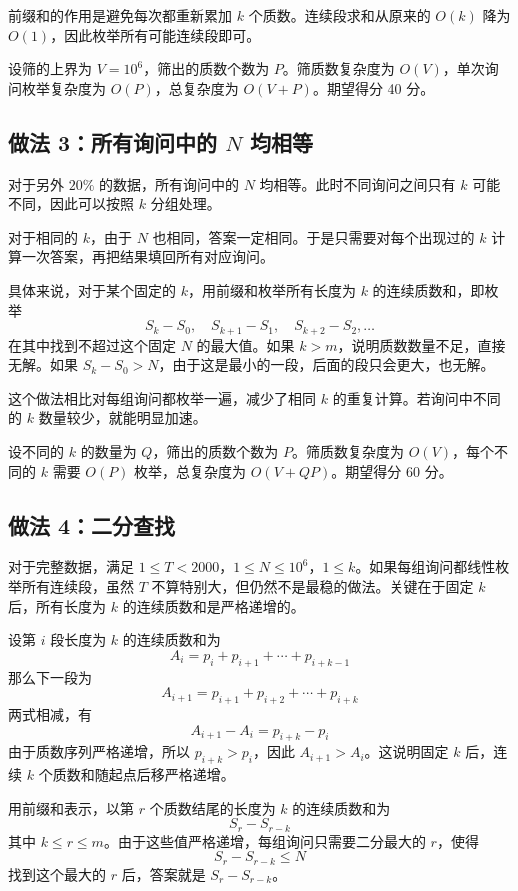 \documentclass[12pt]{ctexart}  %
\begin{document}
前缀和的作用是避免每次都重新累加 $k$ 个质数。连续段求和从原来的 $O(k)$ 降为 $O(1)$，因此枚举所有可能连续段即可。

设筛的上界为 $V=10^6$，筛出的质数个数为 $P$。筛质数复杂度为 $O(V)$，单次询问枚举复杂度为 $O(P)$，总复杂度为 $O(V+P)$。期望得分 40 分。

\subsection{做法 3：所有询问中的 $N$ 均相等}

对于另外 $20\%$ 的数据，所有询问中的 $N$ 均相等。此时不同询问之间只有 $k$ 可能不同，因此可以按照 $k$ 分组处理。

对于相同的 $k$，由于 $N$ 也相同，答案一定相同。于是只需要对每个出现过的 $k$ 计算一次答案，再把结果填回所有对应询问。

具体来说，对于某个固定的 $k$，用前缀和枚举所有长度为 $k$ 的连续质数和，即枚举
$$
S_k-S_0,\quad S_{k+1}-S_1,\quad S_{k+2}-S_2,\dots
$$
在其中找到不超过这个固定 $N$ 的最大值。如果 $k>m$，说明质数数量不足，直接无解。如果 $S_k-S_0>N$，由于这是最小的一段，后面的段只会更大，也无解。

这个做法相比对每组询问都枚举一遍，减少了相同 $k$ 的重复计算。若询问中不同的 $k$ 数量较少，就能明显加速。

设不同的 $k$ 的数量为 $Q$，筛出的质数个数为 $P$。筛质数复杂度为 $O(V)$，每个不同的 $k$ 需要 $O(P)$ 枚举，总复杂度为 $O(V+QP)$。期望得分 60 分。

\subsection{做法 4：二分查找}

对于完整数据，满足 $1\le T<2000$，$1\le N\le 10^6$，$1\le k$。如果每组询问都线性枚举所有连续段，虽然 $T$ 不算特别大，但仍然不是最稳的做法。关键在于固定 $k$ 后，所有长度为 $k$ 的连续质数和是严格递增的。

设第 $i$ 段长度为 $k$ 的连续质数和为
$$
A_i=p_i+p_{i+1}+\cdots+p_{i+k-1}
$$
那么下一段为
$$
A_{i+1}=p_{i+1}+p_{i+2}+\cdots+p_{i+k}
$$
两式相减，有
$$
A_{i+1}-A_i=p_{i+k}-p_i
$$
由于质数序列严格递增，所以 $p_{i+k}>p_i$，因此 $A_{i+1}>A_i$。这说明固定 $k$ 后，连续 $k$ 个质数和随起点后移严格递增。

用前缀和表示，以第 $r$ 个质数结尾的长度为 $k$ 的连续质数和为
$$
S_r-S_{r-k}
$$
其中 $k\le r\le m$。由于这些值严格递增，每组询问只需要二分最大的 $r$，使得
$$
S_r-S_{r-k}\le N
$$
找到这个最大的 $r$ 后，答案就是 $S_r-S_{r-k}$。
\end{document}
